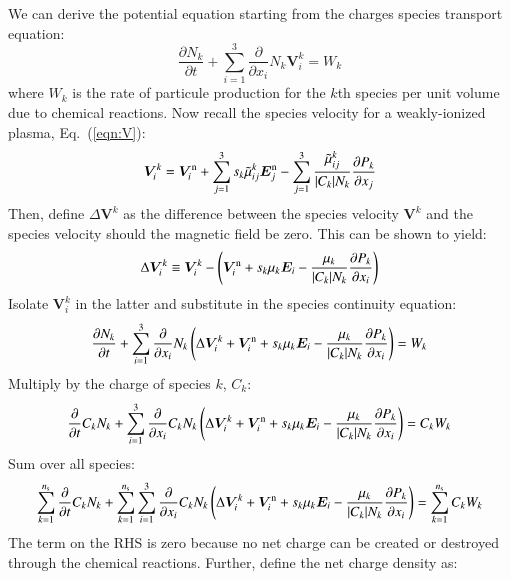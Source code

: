 \documentclass{warpdoc}
\newcommand{\ns}{{n_{\rm s}}}
\newcommand{\nd}{3}
\renewcommand{\vec}[1]{\bm{#1}}
\begin{document}
We can derive the potential equation starting from the charges species transport equation:
%
\begin{equation}
  \frac{\partial N_k}{\partial t} + \sum_{i=1}^3 \frac{\partial}{\partial x_i} N_k \vec{V}_i^k = W_k
\end{equation}
%
where $W_k$ is the rate of particule production for the $k$th species per unit volume due to chemical reactions. Now recall the species velocity for a weakly-ionized plasma, Eq.\ (\ref{eqn:V}):
%
\begin{equation}
  \vec{V}^{k}_i = \vec{V}^{\rm n}_i+\sum_{j=1}^\nd s_k \wtilde{\mu}^k_{ij}  \vec{E}_j^{\rm n}
             - \sum_{j=1}^\nd  \frac{\wtilde{\mu}^{k}_{ij}}{|C_k| N_k} \frac{\partial P_k}{\partial x_j}
\end{equation}
%
Then, define $\Delta \vec{V}^k$ as the difference between the species velocity $\vec{V}^k$ and the species velocity should the magnetic field be zero. This can be shown to yield:
%
\begin{equation}
\Delta \vec{V}^k_i \equiv \vec{V}^k_i - \left(\vec{V}^{\rm n}_i+ s_k \mu_k  \vec{E}_i
             -   \frac{\mu_k}{|C_k| N_k} \frac{\partial P_k}{\partial x_i}\right)
\label{eqn:deltaV}
\end{equation}
%
Isolate $\vec{V}_i^k$ in the latter and substitute in the species continuity equation:
%
\begin{equation}
  \frac{\partial N_k}{\partial t} + \sum_{i=1}^3 \frac{\partial}{\partial x_i} N_k \left(\Delta \vec{V}^k_i+\vec{V}^{\rm n}_i+ s_k \mu_k  \vec{E}_i  -   \frac{\mu_k}{|C_k| N_k} \frac{\partial P_k}{\partial x_i} \right) = W_k
\end{equation}
%
Multiply by the charge of species $k$, $C_k$:
%
\begin{equation}
  \frac{\partial }{\partial t}C_k N_k + \sum_{i=1}^3 \frac{\partial}{\partial x_i} C_k N_k \left(\Delta \vec{V}^k_i+\vec{V}^{\rm n}_i+ s_k \mu_k  \vec{E}_i  -   \frac{\mu_k}{|C_k| N_k} \frac{\partial P_k}{\partial x_i} \right) = C_k W_k
\end{equation}
%
Sum over all species:
%
\begin{equation}
 \sum_{k=1}^\ns \frac{\partial }{\partial t}C_k N_k + \sum_{k=1}^\ns\sum_{i=1}^3 \frac{\partial}{\partial x_i} C_k N_k \left(\Delta \vec{V}^k_i+\vec{V}^{\rm n}_i+ s_k \mu_k  \vec{E}_i  -   \frac{\mu_k}{|C_k| N_k} \frac{\partial P_k}{\partial x_i} \right) = \sum_{k=1}^\ns C_k W_k
\end{equation}
%
The term on the RHS is zero because no net charge can be created or destroyed through the chemical reactions. Further, define the net charge density as:
\end{document}
